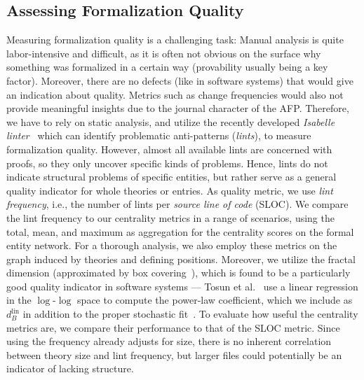 \subsection{Assessing Formalization Quality}
Measuring formalization quality is a challenging task:
Manual analysis is quite labor-intensive and difficult,
as it is often not obvious on the surface why something was formalized in a certain way
(provability usually being a key factor).
Moreover, there are no defects (like in software systems) that would give an indication about quality.
Metrics such as change frequencies would also not provide meaningful insights due to the journal character of the AFP\@.
Therefore, we have to rely on static analysis,
and utilize the recently developed \emph{Isabelle linter}~\cite{Linter2022Megdiche}
which can identify problematic anti-patterns (\emph{lints}),
to measure formalization quality.
However, almost all available lints are concerned with proofs, so they only uncover specific kinds of problems.
Hence, lints do not indicate structural problems of specific entities,
but rather serve as a general quality indicator for whole theories or entries.
As quality metric, we use \emph{lint frequency}, i.e., the number of lints per \emph{source line of code} (SLOC).
We compare the lint frequency to our centrality metrics in a range of scenarios,
using the total, mean, and maximum as aggregation for the centrality scores on the formal entity network.
For a thorough analysis, we also employ these metrics on the graph induced by theories and defining positions.
Moreover, we utilize the fractal dimension (approximated by box covering~\cite{FractalDimension2007Song}),
which is found to be a particularly good quality indicator in software systems
--- Tosun et al.~\cite{NetworkDefects2009Tosun} use a linear regression in the $\log$-$\log$ space to compute the power-law coefficient,
which we include as $d_B^\text{lin}$ in addition to the proper stochastic fit~\cite{PowlawEmpiric2009Clauset}.
To evaluate how useful the centrality metrics are,
we compare their performance to that of the SLOC metric.
Since using the frequency already adjusts for size,
there is no inherent correlation between theory size and lint frequency,
but larger files could potentially be an indicator of lacking structure.

